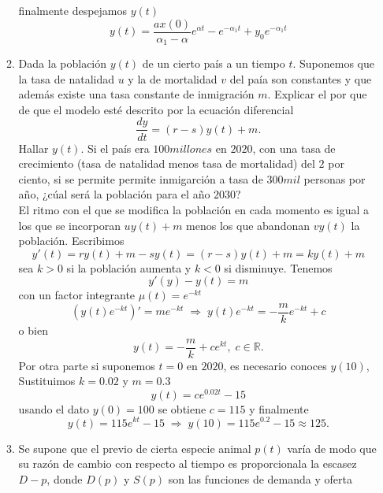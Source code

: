 \documentclass[10pt,a4paper,notitlepage]{report}
\begin{document}
\begin{itemize}
\begin{enumerate}
\begin{equation}
\end{equation}
finalmente despejamos $y(t)$
\begin{equation}
y(t) = \frac{ax(0)}{\alpha_{1} - \alpha} e^{ \alpha t} - e^{-  \alpha_{1} t} + y_{0} e^{- \alpha _{1} t}
\end{equation}
\Large
\item Dada la población $y (t)$ de un cierto país a un tiempo $t$. Suponemos que la tasa de natalidad $u$ y la de mortalidad $v$ del paía son constantes y que además existe una tasa constante de inmigración $m$. Explicar el por que de que el modelo esté descrito por la ecuación diferencial
\begin{equation}
\frac{dy}{dt} = (r - s) y (t) + m.
\end{equation}
Hallar $y (t)$. Si el país era $100 millones$ en $2020$, con una tasa de crecimiento (tasa de natalidad menos tasa de mortalidad) del $2$ por ciento, si se permite permite inmigarción a tasa de $300 mil$ personas por año, ¿cúal será la población para el año $2030$? \\
\large
El ritmo con el que se modifica la población en cada momento es igual a los que se incorporan $uy(t) + m$ menos los que abandonan $v y(t)$ la población. Escribimos
\begin{equation}
y'(t) = ry (t) + m - sy(t) = (r -s) y(t) + m = ky(t) + m
\end{equation}
sea $k > 0$ si la población aumenta y $k < 0$ si disminuye. Tenemos
\begin{equation}
y'(y) - y(t) = m
\end{equation}
con un factor integrante $\mu (t) = e^{-kt}$
\begin{equation}
(y(t) e^{-kt})' = me^{-kt} \; \Rightarrow \; y(t) e^{-kt} = - \frac{m}{k} e^{-kt} + c
\end{equation}
o bien
\begin{equation}
y(t) = - \frac{m}{k} + ce^{kt}, \; c \in \mathbb{R}.
\end{equation}
Por otra parte si suponemos $t= 0$ en $2020$, es necesario conoces $y (10)$, Sustituimos $k = 0.02$ y $m = 0.3$
\begin{equation}
y(t) = ce^{0.02 t} -15
\end{equation}
usando el dato $y (0) = 100$ se obtiene $c = 115$ y finalmente
\begin{equation}
y(t) = 115 e^{kt} - 15 \; \Rightarrow \; y(10) = 115 e^{0.2} - 15 \approx 125.
\end{equation}
\Large
\item Se supone que el previo de cierta especie animal $p(t)$ varía de modo que su razón de cambio con respecto al tiempo es proporcionala la escasez $D - p$, donde $D(p)$ y $S(p)$ son las funciones de demanda y oferta 

\end{enumerate}
\end{itemize}
\end{document}
